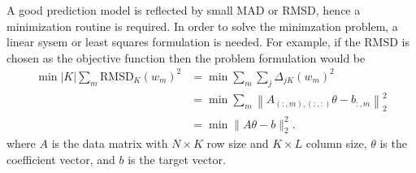 \documentclass[12pt]{article}
\def\D{\displaystyle}
\begin{document}
\iffalse
In order to see the general pattern of (\refeq{eq:delta}), let us see a simple example with $j = 1$, $|K| = 2$, and $L = 2$; and using simplified expressions by omitting the arguments
\begin{equation*}
    \begin{split}
        D_k &:= D_k(w), \\
        S_K &:= S_K(w), \\
        \phi_{k,l} &:= \phi_{k,l}(w),
    \end{split}
\end{equation*}
hence
\begin{equation}
    \begin{split}
        \Delta_{1,K}(w)&:= \frac{\D \frac{ E_1 + \theta_{1,1}\phi_{1,1} + \theta_{1,2}\phi_{1,2}}{D_1S_K} + \frac{E_2 + \theta_{2,1}\phi_{2,1} + \theta_{2,2}\phi_{2,2}}{D_2S_K} - (E_1 + \theta_{1,1}\phi_{1,1} + \theta_{1,2}\phi_{1,2})}{D_1S_K-1} \\
        &= \D \frac{ E_1 + \theta_{1,1}\phi_{1,1} + \theta_{1,2}\phi_{1,2}}{D_1S_K(D_1S_K-1)} + \frac{E_2 + \theta_{2,1}\phi_{2,1} + \theta_{2,2}\phi_{2,2}}{D_2S_K(D_1S_K-1)} - \frac{(E_1 + \theta_{1,1}\phi_{1,1} + \theta_{1,2}\phi_{1,2})}{D_1S_K-1} \\
        &= \dots
    \end{split}
\end{equation}
\fi

A good prediction model is reflected by small MAD or RMSD, hence a minimization routine is required. In order to solve the minimzation problem, a linear sysem or least squares formulation is needed. For example, if the RMSD is chosen as the objective function then the problem formulation would be
\begin{equation}
    \label{eq:min}
    \begin{split}
        \min |K| \sum_m \text{RMSD}_K(w_m)^2 &= \min \sum_m \sum_j \Delta_{jK}(w_m)^2 \\
        &= \min \sum_m \left\| A_{(:,m),(:,:)}\theta - b_{:,m}\right\|_2^2 \\
        &= \min \|A \theta - b\|_2^2.
    \end{split}
\end{equation}
where $A$ is the data matrix with $N \times K$ row size and $K \times L$ column size, $\theta$ is the coefficient vector, and $b$ is the target vector.
\end{document}
